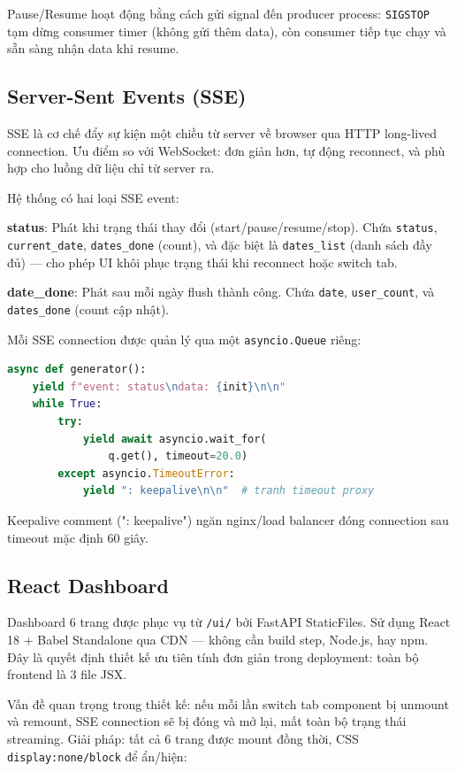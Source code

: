 \documentclass[conference]{IEEEtran}
\begin{document}
Pause/Resume hoạt động bằng cách gửi signal đến producer process:
\texttt{SIGSTOP} tạm dừng consumer timer (không gửi thêm data), còn consumer
tiếp tục chạy và sẵn sàng nhận data khi resume.

\subsection{Server-Sent Events (SSE)}

SSE là cơ chế đẩy sự kiện một chiều từ server về browser qua HTTP long-lived
connection. Ưu điểm so với WebSocket: đơn giản hơn, tự động reconnect, và phù
hợp cho luồng dữ liệu chỉ từ server ra.

Hệ thống có hai loại SSE event:

\textbf{status}: Phát khi trạng thái thay đổi (start/pause/resume/stop).
Chứa \texttt{status}, \texttt{current\_date}, \texttt{dates\_done} (count),
và đặc biệt là \texttt{dates\_list} (danh sách đầy đủ) — cho phép UI khôi
phục trạng thái khi reconnect hoặc switch tab.

\textbf{date\_done}: Phát sau mỗi ngày flush thành công. Chứa \texttt{date},
\texttt{user\_count}, và \texttt{dates\_done} (count cập nhật).

Mỗi SSE connection được quản lý qua một \texttt{asyncio.Queue} riêng:

\begin{lstlisting}[language=Python, caption={SSE generator với keepalive}]
async def generator():
    yield f"event: status\ndata: {init}\n\n"
    while True:
        try:
            yield await asyncio.wait_for(
                q.get(), timeout=20.0)
        except asyncio.TimeoutError:
            yield ": keepalive\n\n"  # tranh timeout proxy
\end{lstlisting}

Keepalive comment (": keepalive") ngăn nginx/load balancer đóng connection
sau timeout mặc định 60 giây.

\subsection{React Dashboard}

Dashboard 6 trang được phục vụ từ \texttt{/ui/} bởi FastAPI StaticFiles.
Sử dụng React 18 + Babel Standalone qua CDN — không cần build step, Node.js,
hay npm. Đây là quyết định thiết kế ưu tiên tính đơn giản trong deployment:
toàn bộ frontend là 3 file JSX.

Vấn đề quan trọng trong thiết kế: nếu mỗi lần switch tab component bị unmount
và remount, SSE connection sẽ bị đóng và mở lại, mất toàn bộ trạng thái
streaming. Giải pháp: tất cả 6 trang được mount đồng thời, CSS
\texttt{display:none/block} để ẩn/hiện:
\end{document}
